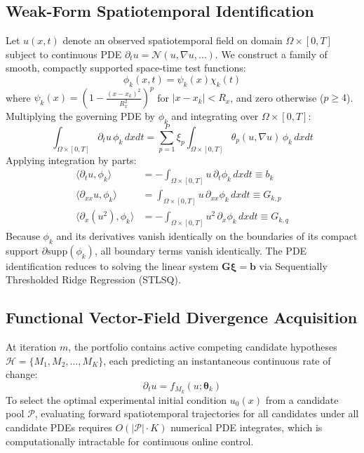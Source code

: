 \documentclass[twocolumn,10pt,a4paper]{article}
\begin{document}
\subsection{Weak-Form Spatiotemporal Identification}
Let $u(x, t)$ denote an observed spatiotemporal field on domain $\Omega \times [0, T]$ subject to continuous PDE $\partial_t u = \mathcal{N}(u, \nabla u, \dots)$. We construct a family of smooth, compactly supported space-time test functions:
\begin{equation}
\phi_k(x, t) = \psi_k(x) \chi_k(t)
\end{equation}
where $\psi_k(x) = \left(1 - \frac{(x - x_k)^2}{R_x^2}\right)^p$ for $|x - x_k| < R_x$, and zero otherwise ($p \ge 4$). Multiplying the governing PDE by $\phi_k$ and integrating over $\Omega \times [0, T]$:
\begin{equation}
\int_{\Omega \times [0, T]} \partial_t u \, \phi_k \, dx dt = \sum_{p=1}^P \xi_p \int_{\Omega \times [0, T]} \theta_p(u, \nabla u) \, \phi_k \, dx dt
\end{equation}
Applying integration by parts:
\begin{align}
\langle \partial_t u, \phi_k \rangle &= - \int_{\Omega \times [0, T]} u \, \partial_t \phi_k \, dx dt \equiv b_k \\
\langle \partial_{xx} u, \phi_k \rangle &= \int_{\Omega \times [0, T]} u \, \partial_{xx} \phi_k \, dx dt \equiv G_{k, p} \\
\langle \partial_x (u^2), \phi_k \rangle &= - \int_{\Omega \times [0, T]} u^2 \, \partial_x \phi_k \, dx dt \equiv G_{k, q}
\end{align}
Because $\phi_k$ and its derivatives vanish identically on the boundaries of its compact support $\partial \text{supp}(\phi_k)$, all boundary terms vanish identically. The PDE identification reduces to solving the linear system $\mathbf{G} \boldsymbol{\xi} = \mathbf{b}$ via Sequentially Thresholded Ridge Regression (STLSQ).

\subsection{Functional Vector-Field Divergence Acquisition}
At iteration $m$, the portfolio contains active competing candidate hypotheses $\mathcal{H} = \{M_1, M_2, \dots, M_K\}$, each predicting an instantaneous continuous rate of change:
\begin{equation}
\partial_t u = f_{M_k}(u; \boldsymbol{\theta}_k)
\end{equation}
To select the optimal experimental initial condition $u_0(x)$ from a candidate pool $\mathcal{P}$, evaluating forward spatiotemporal trajectories for all candidates under all candidate PDEs requires $O(|\mathcal{P}| \cdot K)$ numerical PDE integrates, which is computationally intractable for continuous online control.
\end{document}
